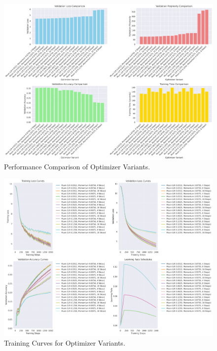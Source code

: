 \documentclass{article}
\begin{document}
\begin{figure}[h!]
    \centering
    \includegraphics[width=\textwidth]{images/performance_comparison.png}
    \caption{Performance Comparison of Optimizer Variants.}
    \label{fig:performance_comparison}
\end{figure}

\begin{figure}[h!]
    \centering
    \includegraphics[width=\textwidth]{images/training_curves.png}
    \caption{Training Curves for Optimizer Variants.}
    \label{fig:training_curves}
\end{figure}
\end{document}

